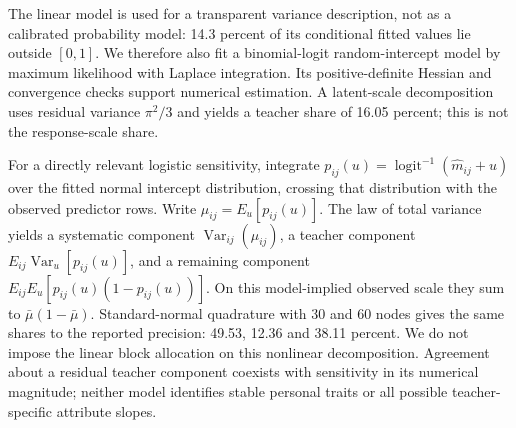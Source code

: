 \begin{addition}
The linear model is used for a transparent variance description, not as a calibrated probability model: 14.3 percent of its conditional fitted values lie outside $[0,1]$. We therefore also fit a binomial-logit random-intercept model by maximum likelihood with Laplace integration. Its positive-definite Hessian and convergence checks support numerical estimation. A latent-scale decomposition uses residual variance $\pi^2/3$ and yields a teacher share of 16.05 percent; this is not the response-scale share.

For a directly relevant logistic sensitivity, integrate $p_{ij}(u)=\operatorname{logit}^{-1}(\widehat m_{ij}+u)$ over the fitted normal intercept distribution, crossing that distribution with the observed predictor rows. Write $\mu_{ij}=E_u[p_{ij}(u)]$. The law of total variance yields a systematic component $\operatorname{Var}_{ij}(\mu_{ij})$, a teacher component $E_{ij}\operatorname{Var}_u[p_{ij}(u)]$, and a remaining component $E_{ij}E_u[p_{ij}(u)(1-p_{ij}(u))]$. On this model-implied observed scale they sum to $\bar\mu(1-\bar\mu)$. Standard-normal quadrature with 30 and 60 nodes gives the same shares to the reported precision: 49.53, 12.36 and 38.11 percent. We do not impose the linear block allocation on this nonlinear decomposition. Agreement about a residual teacher component coexists with sensitivity in its numerical magnitude; neither model identifies stable personal traits or all possible teacher-specific attribute slopes.
\end{addition}

